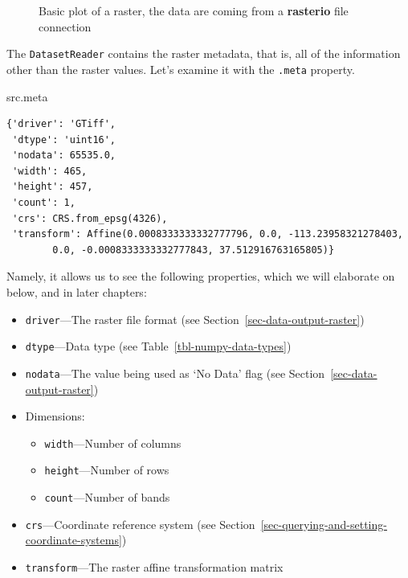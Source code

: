 \documentclass[
  letterpaper,
]{krantz}
\newenvironment{Shaded}{\begin{snugshade}}{\end{snugshade}}
\newcommand{\NormalTok}[1]{\textcolor[rgb]{0.00,0.23,0.31}{#1}}
\providecommand{\tightlist}{%
  \setlength{\itemsep}{0pt}\setlength{\parskip}{0pt}}\usepackage{longtable,booktabs,array}
\begin{document}
\begin{figure}[H]


\caption{\label{fig-rasterio-plot}Basic plot of a raster, the data are
coming from a \textbf{rasterio} file connection}

\end{figure}%

The \texttt{DatasetReader} contains the raster metadata, that is, all of
the information other than the raster values. Let's examine it with the
\texttt{.meta} property.

\begin{Shaded}
\begin{Highlighting}[]
\NormalTok{src.meta}
\end{Highlighting}
\end{Shaded}

\begin{verbatim}
{'driver': 'GTiff',
 'dtype': 'uint16',
 'nodata': 65535.0,
 'width': 465,
 'height': 457,
 'count': 1,
 'crs': CRS.from_epsg(4326),
 'transform': Affine(0.0008333333332777796, 0.0, -113.23958321278403,
        0.0, -0.0008333333332777843, 37.512916763165805)}
\end{verbatim}

Namely, it allows us to see the following properties, which we will
elaborate on below, and in later chapters:

\begin{itemize}
\tightlist
\item
  \texttt{driver}---The raster file format (see
  Section~\ref{sec-data-output-raster})
\item
  \texttt{dtype}---Data type (see Table~\ref{tbl-numpy-data-types})
\item
  \texttt{nodata}---The value being used as `No Data' flag (see
  Section~\ref{sec-data-output-raster})
\item
  Dimensions:

  \begin{itemize}
  \tightlist
  \item
    \texttt{width}---Number of columns
  \item
    \texttt{height}---Number of rows
  \item
    \texttt{count}---Number of bands
  \end{itemize}
\item
  \texttt{crs}---Coordinate reference system (see
  Section~\ref{sec-querying-and-setting-coordinate-systems})
\item
  \texttt{transform}---The raster affine transformation matrix
\end{itemize}
\end{document}
